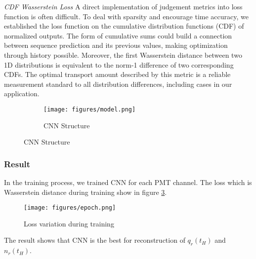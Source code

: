 \emph{CDF Wasserstein Loss}
A direct implementation of judgement metrics into loss function is often difficult. To deal with sparsity and encourage time accuracy, we established the loss function on the cumulative distribution functions (CDF) of normalized outputs. The form of cumulative sums could build a connection between sequence prediction and its previous values, making optimization through history possible. Moreover, the first Wasserstein distance between two 1D distributions is equivalent to the norm-1 difference of two corresponding CDFs. The optimal transport amount described by this metric is a reliable measurement standard to all distribution differences, including cases in our application.

\begin{figure}[H]
\begin{minipage}{.3\textwidth}
\begin{figure}[H]
    \centering
    \texttt{[image: figures/model.png]}
    \caption{\label{fig:struct} CNN Structure}
\end{figure}
\end{minipage}
\hspace{4mm}
\begin{minipage}{.7\textwidth}

\end{minipage}
\end{figure}

\subsubsection{Result}
In the training process, we trained CNN for each PMT channel. The loss which is Wasserstein distance during training show in figure \ref{fig:loss}. 

\begin{figure}[H]
    \centering
    \texttt{[image: figures/epoch.png]}
    \caption{\label{fig:loss} Loss variation during training}
\end{figure}

The result shows that CNN is the best for reconstruction of $q_{r}(t_{H})$ and $n_{r}(t_{H})$. 

